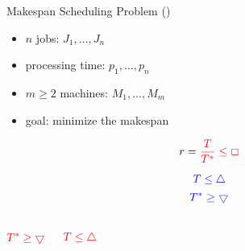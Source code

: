 
\begin{frame}
  \begin{exampleblock}{Makespan Scheduling Problem (\ms{})}
	\begin{itemize}
	  \item $n$ jobs: $J_1, \dots, J_n$
	  \item processing time: $p_1, \dots, p_n$
	  \item $m \ge 2$ machines: $M_1, \dots, M_m$
	 ­\item goal: minimize the makespan
	\end{itemize}
  \end{exampleblock}

  \pause
  \[
	r = \textcolor{red}{\frac{T}{T^{\ast}} \le \Box}
  \]

  \pause
  \[
	\textcolor{blue}{T \le \bigtriangleup}
  \]
  \[
	\textcolor{blue}{T^{\ast} \ge \bigtriangledown}
  \]
\end{frame}

\begin{frame}
  \begin{columns}
	  \[
		\textcolor{red}{T^{\ast} \ge \bigtriangledown}
	  \]

	  \[
		\textcolor{red}{T \le \bigtriangleup}
	  \]

  \end{columns}
\end{frame}

